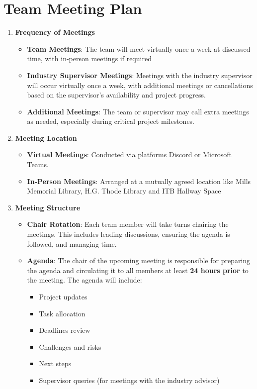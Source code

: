 \documentclass{article}
\begin{document}

\section{Team Meeting Plan}

\begin{enumerate}[label=\textbf{\arabic*}]
    \item \textbf{Frequency of Meetings}
    \begin{itemize}
        \item \textbf{Team Meetings}: The team will meet virtually once a week at discussed time, with in-person meetings if required
        \item \textbf{Industry Supervisor Meetings}: Meetings with the industry supervisor will occur virtually once a week, with additional meetings or cancellations based on the supervisor's availability and project progress.
        \item \textbf{Additional Meetings}: The team or supervisor may call extra meetings as needed, especially during critical project milestones.
    \end{itemize}
    
    \item \textbf{Meeting Location}
    \begin{itemize}
        \item \textbf{Virtual Meetings}: Conducted via platforms Discord or Microsoft Teams.
        \item \textbf{In-Person Meetings}: Arranged at a mutually agreed location like Mills Memorial Library, H.G. Thode Library and ITB Hallway Space 
    \end{itemize}

    \item \textbf{Meeting Structure}
    \begin{itemize}
    \item \textbf{Chair Rotation}: Each team member will take turns chairing the meetings. This includes leading discussions, ensuring the agenda is followed, and managing time.
    \item \textbf{Agenda}: The chair of the upcoming meeting is responsible for preparing the agenda and circulating it to all members at least \textbf{24 hours prior} to the meeting. The agenda will include:
    \begin{itemize}
        \item Project updates
        \item Task allocation
        \item Deadlines review
        \item Challenges and risks
        \item Next steps
        \item Supervisor queries (for meetings with the industry advisor)
    \end{itemize}
    \end{itemize}


\end{enumerate}
\end{document}
